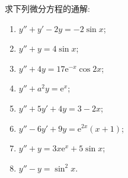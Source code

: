 \documentclass[lang=cn,11pt]{elegantbook}
\begin{document}
\begin{exercise}[非齐次方程通解]
求下列微分方程的通解:
\begin{enumerate}
    \item[(1)] $y''+y'-2y=-2\sin x$;
    \item[(2)] $y''+y=4\sin x$;
    \item[(3)] $y''+4y=17\mathrm{e}^{-x}\cos 2x$;
    \item[(4)] $y''+a^2y=\mathrm{e}^x$;
    \item[(5)] $y''+5y'+4y=3-2x$;
    \item[(6)] $y''-6y'+9y=\mathrm{e}^{2x}(x+1)$;
    \item[(7)] $y''+y=3x\mathrm{e}^x+5\sin x$;
    \item[(8)] $y''-y=\sin^2 x$.
\end{enumerate}
\end{exercise}
\end{document}
